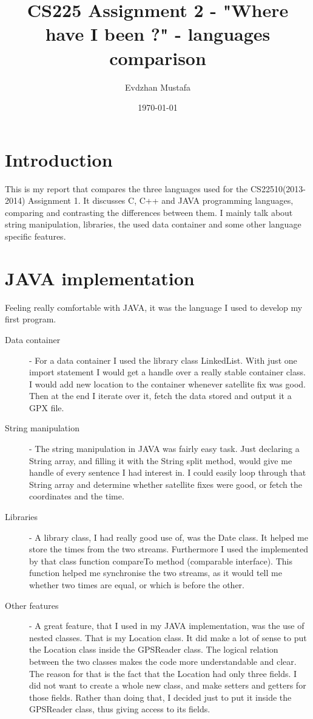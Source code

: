 \documentclass[a4paper]{article}
\title{ CS225 Assignment 2 - "Where have I been ?" - languages comparison   }
\author{Evdzhan Mustafa}
\date{\today}
\begin{document}
\maketitle

\section{Introduction}
This is my report that compares the three languages used for the CS22510(2013-2014) Assignment 1. It discusses C, C++ and JAVA programming languages, comparing and contrasting the differences between them. I mainly talk about string manipulation, libraries, the used data container and some other language specific features.
\section{JAVA implementation}
Feeling really comfortable with JAVA, it was the language I used to develop my first program.
\begin{description}
  \item[Data container] - For a data container I used the library class LinkedList. With just one import statement I would get a handle over a really stable container class. I would add new location to the container whenever satellite fix was good. Then at the end I iterate over it, fetch the data stored and output it a GPX file. 
  \item[String manipulation] - The string manipulation in JAVA was fairly easy task. Just declaring a String array, and filling it with the String split method, would give me handle of every sentence I had interest in. I could easily loop through that String array and determine whether satellite fixes were good, or fetch the coordinates and the time.
  \item[Libraries] - A library class, I had really good use of, was the Date class. It helped me store the times from the two streams. Furthermore I used the implemented by that class function compareTo method (comparable interface). This function helped me synchronise the two streams, as it would tell me whether two times are equal, or which is before the other.
    \item[Other features] - A great feature, that I used in my JAVA implementation, was the use of nested classes. That is my Location class. It did make a lot of sense to put the Location class inside the GPSReader class. The logical relation between the two classes makes the code more understandable and clear. The reason for that is the fact that the Location had only three fields. I did not want to create a whole new class, and make setters and getters for those fields. Rather than doing that, I decided just to put it inside the GPSReader class, thus giving access to its fields.
\end{description}
\end{document}

